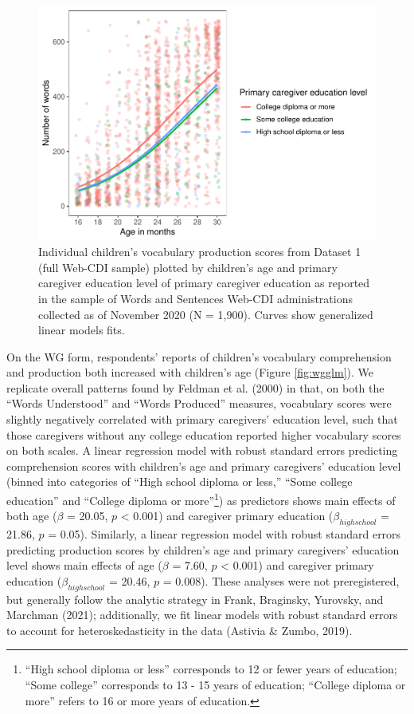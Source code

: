 \documentclass[
  english,
  ,man,floatsintext]{apa6}
\begin{document}
\begin{figure}
\centering
\includegraphics{webcdi_paper_files/figure-latex/wsglm-1.pdf}
\caption{\label{fig:wsglm}Individual children's vocabulary production scores from Dataset 1 (full Web-CDI sample) plotted by children's age and primary caregiver education level of primary caregiver education as reported in the sample of Words and Sentences Web-CDI administrations collected as of November 2020 (N = 1,900). Curves show generalized linear models fits.}
\end{figure}

On the WG form, respondents' reports of children's vocabulary comprehension and production both increased with children's age (Figure \ref{fig:wgglm}). We replicate overall patterns found by Feldman et al. (2000) in that, on both the ``Words Understood'' and ``Words Produced'' measures, vocabulary scores were slightly negatively correlated with primary caregivers' education level, such that those caregivers without any college education reported higher vocabulary scores on both scales. A linear regression model with robust standard errors predicting comprehension scores with children's age and primary caregivers' education level (binned into categories of ``High school diploma or less,'' ``Some college education'' and ``College diploma or more''\footnote{``High school diploma or less'' corresponds to 12 or fewer years of education; ``Some college'' corresponds to 13 - 15 years of education; ``College diploma or more'' refers to 16 or more years of education.}) as predictors shows main effects of both age (\(\beta\) = 20.05, \(p\) \textless{} 0.001) and caregiver primary education (\(\beta_{high school}\) = 21.86, \(p\) = 0.05). Similarly, a linear regression model with robust standard errors predicting production scores by children's age and primary caregivers' education level shows main effects of age (\(\beta\) = 7.60, \(p\) \textless{} 0.001) and caregiver primary education (\(\beta_{high school}\) = 20.46, \(p\) = 0.008). These analyses were not preregistered, but generally follow the analytic strategy in Frank, Braginsky, Yurovsky, and Marchman (2021); additionally, we fit linear models with robust standard errors to account for heteroskedasticity in the data (Astivia \& Zumbo, 2019).
\end{document}

